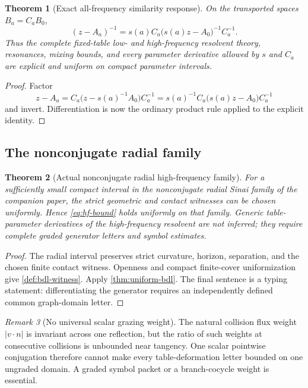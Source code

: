 \documentclass[11pt,reqno]{amsart}
\newtheorem{theorem}{Theorem}[section]
\theoremstyle{definition}
\theoremstyle{remark}
\newtheorem{remark}[theorem]{Remark}
\newcommand{\abs}[1]{\left\lvert #1\right\rvert}
\begin{document}
\begin{theorem}[Exact all-frequency similarity response]\label{thm:similarity-bdl}
On the transported spaces $B_a=C_aB_0$,
\begin{equation}\label{eq:resolvent-scaling}
 (z-A_a)^{-1}
 =s(a)C_a\bigl(s(a)z-A_0\bigr)^{-1}C_a^{-1}.
\end{equation}
Thus the complete fixed-table low- and high-frequency resolvent theory,
resonances, mixing bounds, and every parameter derivative allowed by $s$ and
$C_a$ are explicit and uniform on compact parameter intervals.
\end{theorem}

\begin{proof}
Factor
\[
 z-A_a=C_a\bigl(z-s(a)^{-1}A_0\bigr)C_a^{-1}
 =s(a)^{-1}C_a\bigl(s(a)z-A_0\bigr)C_a^{-1}
\]
and invert.  Differentiation is now the ordinary product rule applied to the
explicit identity.
\end{proof}

\subsection{The nonconjugate radial family}

\begin{theorem}[Actual nonconjugate radial high-frequency family]\label{thm:radial-hf}
For a sufficiently small compact interval in the nonconjugate radial Sinai
family of the companion paper, the strict geometric and contact witnesses can
be chosen uniformly.  Hence \eqref{eq:hf-bound} holds uniformly on that family.
Generic table-parameter derivatives of the high-frequency resolvent are not
inferred; they require complete graded generator letters and symbol estimates.
\end{theorem}

\begin{proof}
The radial interval preserves strict curvature, horizon, separation, and the
chosen finite contact witness.  Openness and compact finite-cover
uniformization give \cref{def:bdl-witness}.  Apply
\cref{thm:uniform-bdl}.  The final sentence is a typing statement: differentiating
the generator requires an independently defined common graph-domain letter.
\end{proof}

\begin{remark}[No universal scalar grazing weight]
The natural collision flux weight $\abs{v\cdot n}$ is invariant across one
reflection, but the ratio of such weights at consecutive collisions is
unbounded near tangency.  One scalar pointwise conjugation therefore cannot
make every table-deformation letter bounded on one ungraded domain.  A graded
symbol packet or a branch-cocycle weight is essential.
\end{remark}
\end{document}
